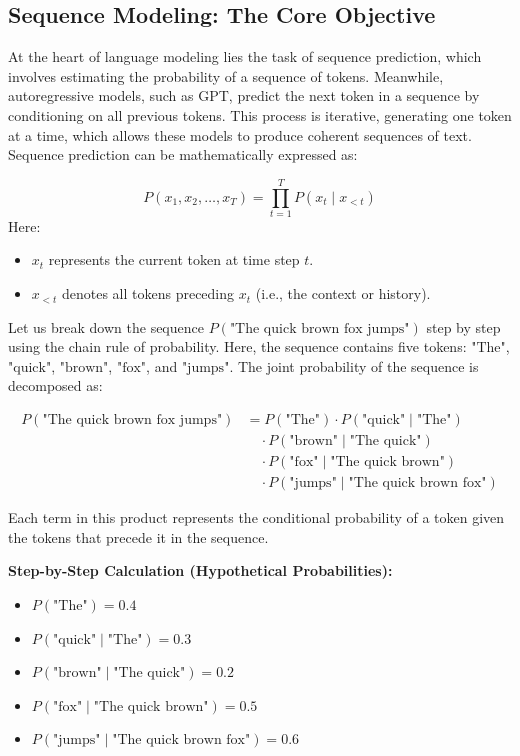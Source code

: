 \subsection{Sequence Modeling: The Core Objective}
\begin{flushleft}
    \large At the heart of language modeling lies the task of sequence prediction, which involves estimating the probability of a sequence of tokens. Meanwhile, autoregressive models, such as GPT, predict the next token in a sequence by conditioning on all previous tokens. This process is iterative, generating one token at a time, which allows these models to produce coherent sequences of text. Sequence prediction can be mathematically expressed as:
    
    \[
    P(x_1, x_2, \dots, x_T) = \prod_{t=1}^T P(x_t \mid x_{<t})
    \]
    Here:
    \begin{itemize}
        \item \(x_t\) represents the current token at time step \(t\).
        \item \(x_{<t}\) denotes all tokens preceding \(x_t\) (i.e., the context or history).
    \end{itemize}

    Let us break down the sequence \(P(\text{"The quick brown fox jumps"})\) step by step using the chain rule of probability. Here, the sequence contains five tokens: \(\text{"The"}\), \(\text{"quick"}\), \(\text{"brown"}\), \(\text{"fox"}\), and \(\text{"jumps"}\). The joint probability of the sequence is decomposed as:

    \[
    \begin{aligned}
    P(\text{"The quick brown fox jumps"}) 
    & = P(\text{"The"}) \cdot P(\text{"quick"} \mid \text{"The"}) \\
    & \quad \cdot P(\text{"brown"} \mid \text{"The quick"}) \\
    & \quad \cdot P(\text{"fox"} \mid \text{"The quick brown"}) \\
    & \quad \cdot P(\text{"jumps"} \mid \text{"The quick brown fox"})
    \end{aligned}
    \]


    Each term in this product represents the conditional probability of a token given the tokens that precede it in the sequence. \break

    \textbf{Step-by-Step Calculation (Hypothetical Probabilities):}
    \begin{itemize}
        \item \(P(\text{"The"}) = 0.4\)
        \item \(P(\text{"quick"} \mid \text{"The"}) = 0.3\)
        \item \(P(\text{"brown"} \mid \text{"The quick"}) = 0.2\)
        \item \(P(\text{"fox"} \mid \text{"The quick brown"}) = 0.5\)
        \item \(P(\text{"jumps"} \mid \text{"The quick brown fox"}) = 0.6\)
    \end{itemize}


\end{flushleft}
